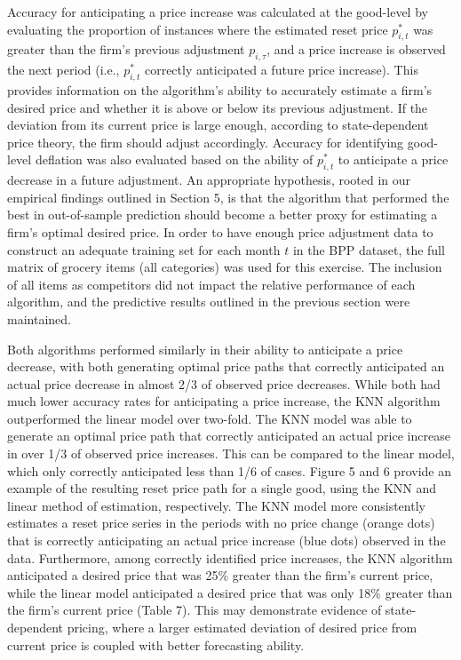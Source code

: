 \documentclass[11pt]{article}
\begin{document}
Accuracy for anticipating a price increase was calculated at the good-level by evaluating the proportion of instances where the estimated reset price $p_{i,t}^{*}$ was greater than the firm's previous adjustment $p_{i,\tau}$, and a price increase is observed the next period (i.e., $p_{i,t}^{*}$ correctly anticipated a future price increase). This provides information on the algorithm's ability to accurately estimate a firm's desired price and whether it is above or below its previous adjustment. If the deviation from its current price is large enough, according to state-dependent price theory, the firm should adjust accordingly. Accuracy for identifying good-level deflation was also evaluated based on the ability of $p_{i,t}^{*}$ to anticipate a price decrease in a future adjustment. An appropriate hypothesis, rooted in our empirical findings outlined in Section 5, is that the algorithm that performed the best in out-of-sample prediction should become a better proxy for estimating a firm's optimal desired price. In order to have enough price adjustment data to construct an adequate training set for each month $t$ in the BPP dataset, the full matrix of grocery items (all categories) was used for this exercise. The inclusion of all items as competitors did not impact the relative performance of each algorithm, and the predictive results outlined in the previous section were maintained. 

Both algorithms performed similarly in their ability to anticipate a price decrease, with both generating optimal price paths that correctly anticipated an actual price decrease in almost 2/3 of observed price decreases. While both had much lower accuracy rates for anticipating a price increase, the KNN algorithm outperformed the linear model over two-fold. The KNN model was able to generate an optimal price path that correctly anticipated an actual price increase in over 1/3 of observed price increases. This can be compared to the linear model, which only correctly anticipated less than 1/6 of cases. Figure 5 and 6 provide an example of the resulting reset price path for a single good, using the KNN and linear method of estimation, respectively. The KNN model more consistently estimates a reset price series in the periods with no price change (orange dots)  that is correctly anticipating an actual price increase (blue dots) observed in the data. Furthermore, among correctly identified price increases, the KNN algorithm anticipated a desired price that was 25\% greater than the firm's current price, while the linear model anticipated a desired price that was only 18\% greater than the firm's current price (Table 7). This may demonstrate evidence of state-dependent pricing, where a larger estimated deviation of desired price from current price is coupled with better forecasting ability.
\end{document}
